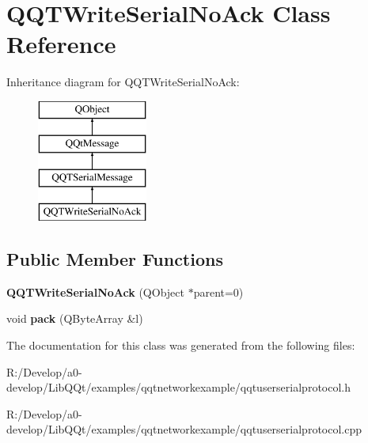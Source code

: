 \hypertarget{class_q_q_t_write_serial_no_ack}{}\section{Q\+Q\+T\+Write\+Serial\+No\+Ack Class Reference}
\label{class_q_q_t_write_serial_no_ack}
Inheritance diagram for Q\+Q\+T\+Write\+Serial\+No\+Ack\+:\begin{figure}[H]
\begin{center}
\leavevmode
\includegraphics[height=4.000000cm]{class_q_q_t_write_serial_no_ack}
\end{center}
\end{figure}
\subsection*{Public Member Functions}
\begin{DoxyCompactItemize}
\item 
\mbox{\label{class_q_q_t_write_serial_no_ack_a13a98576fa1b8de70bc434a6711270f9}} 
{\bfseries Q\+Q\+T\+Write\+Serial\+No\+Ack} (Q\+Object $\ast$parent=0)
\item 
\mbox{\label{class_q_q_t_write_serial_no_ack_ae68f7912efd79aa8864f7c0126f5db92}} 
void {\bfseries pack} (Q\+Byte\+Array \&l)
\end{DoxyCompactItemize}


The documentation for this class was generated from the following files\+:\begin{DoxyCompactItemize}
\item 
R\+:/\+Develop/a0-\/develop/\+Lib\+Q\+Qt/examples/qqtnetworkexample/qqtuserserialprotocol.\+h\item 
R\+:/\+Develop/a0-\/develop/\+Lib\+Q\+Qt/examples/qqtnetworkexample/qqtuserserialprotocol.\+cpp\end{DoxyCompactItemize}
